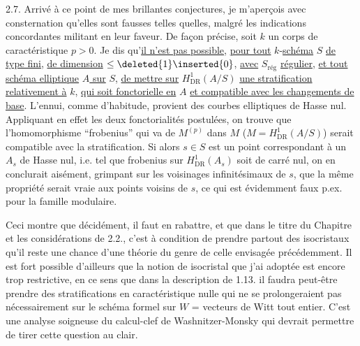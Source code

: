 2.7. Arrivé à ce point de mes brillantes conjectures, je m'aperçois avec consternation qu'elles sont fausses telles quelles, malgré les indications concordantes militant en leur faveur. De façon précise, soit $k$ un corps de caractéristique  $p>0$. Je dis qu'\uline{il n'est pas possible}, \uline{pour tout} $k$-\uline{schéma} $S$ \uline{de type fini}, \uline{de dimension} $\le\deleted{1}\inserted{0}$, \uline{avec} $S_{\text{rég}}$ \uline{régulier}, \uline{et tout schéma elliptique} \uline{$A$ sur} $S$, \uline{de mettre sur} $H^1_{\operatorname{DR}}(A/S)$ \uline{une stratification relativement à} $k$, \uline{qui soit fonctorielle en} $A$ \uline{et compatible avec les changements de base}. L'ennui, comme d'habitude, provient des courbes elliptiques de Hasse nul. Appliquant en effet les deux fonctorialités postulées, on trouve que l'homomorphisme ``frobenius'' qui va de $M^{(p)}$ dans $M$ ($M=H^1_{\operatorname{DR}}(A/S)$) serait compatible avec la stratification. Si alors $s\in S$ est un point correspondant à un $A_s$ de Hasse nul, i.e. tel que frobenius sur $H^1_{\operatorname{DR}}(A_s)$ soit de carré nul, on en conclurait aisément, grimpant sur les voisinages infinitésimaux de $s$, que la même propriété serait vraie aux points voisins de $s$, ce qui est évidemment faux p.ex. pour la famille modulaire.


Ceci montre que décidément, il faut en rabattre, et que dans le titre du Chapitre et les considérations de 2.2., c'est à condition de prendre partout des isocristaux qu'il reste une chance d'une théorie du genre de celle envisagée précédemment. Il est fort possible d'ailleurs que la notion de isocristal que j'ai adoptée est encore trop restrictive, en ce sens que dans la description de 1.13. il faudra peut-être prendre des stratifications en caractéristique nulle qui ne se prolongeraient pas nécessairement sur le schéma formel sur $W$ = vecteurs de Witt tout entier. C'est une analyse soigneuse du calcul-clef de Washnitzer-Monsky qui devrait permettre de tirer cette question au clair.

